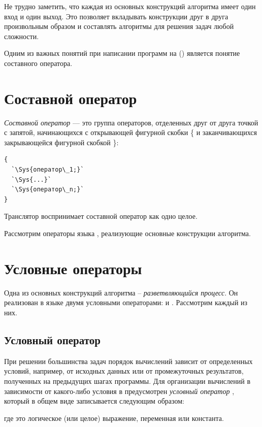 Не трудно заметить, что каждая из основных конструкций алгоритма имеет один вход и один выход. Это позволяет вкладывать
конструкции друг в друга произвольным образом и составлять алгоритмы для решения задач любой сложности.

Одним из важных понятий при написании программ на () является понятие составного оператора.

\section[Составной оператор]{Составной оператор}
\emph{Составной оператор} --- это группа операторов, отделенных друг от друга
точкой с запятой, начинающихся с открывающей фигурной скобки \{ и заканчивающихся закрывающейся
фигурной скобкой \}:
\begin{lstlisting}
{
  `\Sys{оператор\_1;}`
  `\Sys{...}`
  `\Sys{оператор\_n;}`
}
\end{lstlisting}

Транслятор воспринимает составной оператор как одно целое.

Рассмотрим операторы языка , реализующие основные конструкции алгоритма.

\section[Условные операторы]{Условные операторы}
Одна из основных конструкций алгоритма –
\emph{разветвляющийся процесс}. Он реализован в языке
 двумя условными операторами:  и . Рассмотрим каждый из них.

\subsection[Условный оператор]{Условный оператор}
При решении большинства задач порядок вычислений зависит от определенных условий, например, от исходных данных или от
промежуточных результатов, полученных на предыдущих шагах программы. Для организации вычислений в зависимости от
какого-либо условия в  предусмотрен \emph{условный оператор} , 
который в общем виде записывается следующим образом:


где  это логическое (или целое) выражение, переменная или константа. 

